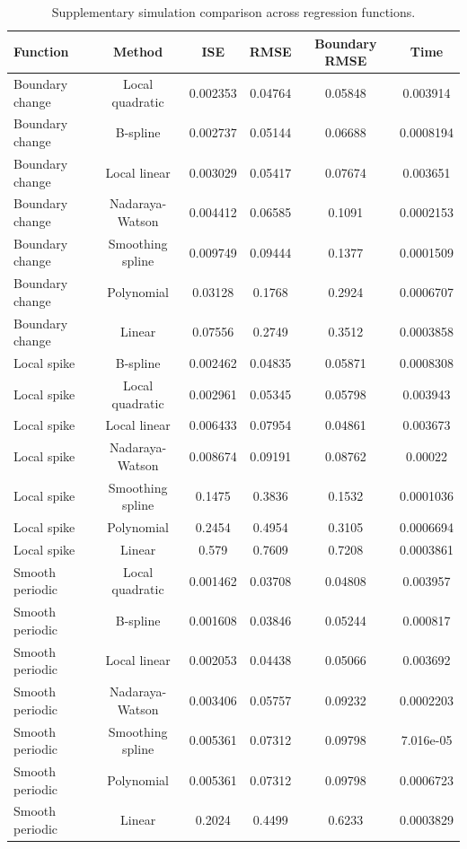 \begin{table}[H]
\centering
\caption{Supplementary simulation comparison across regression functions.}
\label{tab:method-comparison-full}
\small
\begin{tabular}{lccccc}
\toprule
Function & Method & ISE & RMSE & Boundary RMSE & Time \\
\midrule
Boundary change & Local quadratic & 0.002353 & 0.04764 & 0.05848 & 0.003914 \\
Boundary change & B-spline & 0.002737 & 0.05144 & 0.06688 & 0.0008194 \\
Boundary change & Local linear & 0.003029 & 0.05417 & 0.07674 & 0.003651 \\
Boundary change & Nadaraya-Watson & 0.004412 & 0.06585 & 0.1091 & 0.0002153 \\
Boundary change & Smoothing spline & 0.009749 & 0.09444 & 0.1377 & 0.0001509 \\
Boundary change & Polynomial & 0.03128 & 0.1768 & 0.2924 & 0.0006707 \\
Boundary change & Linear & 0.07556 & 0.2749 & 0.3512 & 0.0003858 \\
Local spike & B-spline & 0.002462 & 0.04835 & 0.05871 & 0.0008308 \\
Local spike & Local quadratic & 0.002961 & 0.05345 & 0.05798 & 0.003943 \\
Local spike & Local linear & 0.006433 & 0.07954 & 0.04861 & 0.003673 \\
Local spike & Nadaraya-Watson & 0.008674 & 0.09191 & 0.08762 & 0.00022 \\
Local spike & Smoothing spline & 0.1475 & 0.3836 & 0.1532 & 0.0001036 \\
Local spike & Polynomial & 0.2454 & 0.4954 & 0.3105 & 0.0006694 \\
Local spike & Linear & 0.579 & 0.7609 & 0.7208 & 0.0003861 \\
Smooth periodic & Local quadratic & 0.001462 & 0.03708 & 0.04808 & 0.003957 \\
Smooth periodic & B-spline & 0.001608 & 0.03846 & 0.05244 & 0.000817 \\
Smooth periodic & Local linear & 0.002053 & 0.04438 & 0.05066 & 0.003692 \\
Smooth periodic & Nadaraya-Watson & 0.003406 & 0.05757 & 0.09232 & 0.0002203 \\
Smooth periodic & Smoothing spline & 0.005361 & 0.07312 & 0.09798 & 7.016e-05 \\
Smooth periodic & Polynomial & 0.005361 & 0.07312 & 0.09798 & 0.0006723 \\
Smooth periodic & Linear & 0.2024 & 0.4499 & 0.6233 & 0.0003829 \\
\bottomrule
\end{tabular}
\end{table}

